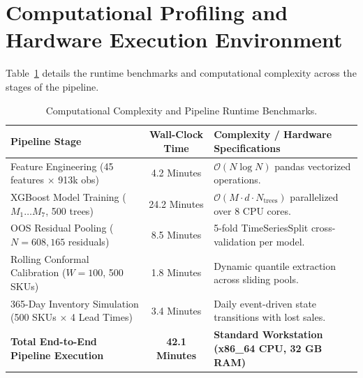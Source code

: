 \documentclass[11pt,a4paper]{article}
\begin{document}
\section{Computational Profiling and Hardware Execution Environment}
\label{app:computational_profiling}

Table~\ref{tab:app_computational} details the runtime benchmarks and computational complexity across the stages of the pipeline.

\begin{table}[htbp]
\centering
\small
\caption{Computational Complexity and Pipeline Runtime Benchmarks.}
\label{tab:app_computational}
\begin{tabular}{lcp{8.5cm}}
\toprule
\textbf{Pipeline Stage} & \textbf{Wall-Clock Time} & \textbf{Complexity / Hardware Specifications} \\
\midrule
Feature Engineering (45 features $\times$ 913k obs) & 4.2 Minutes & $\mathcal{O}(N \log N)$ pandas vectorized operations. \\
XGBoost Model Training ($M_1 \dots M_7$, 500 trees) & 24.2 Minutes & $\mathcal{O}(M \cdot d \cdot N_{\text{trees}})$ parallelized over 8 CPU cores. \\
OOS Residual Pooling ($N = 608,165$ residuals) & 8.5 Minutes & 5-fold TimeSeriesSplit cross-validation per model. \\
Rolling Conformal Calibration ($W=100$, 500 SKUs) & 1.8 Minutes & Dynamic quantile extraction across sliding pools. \\
365-Day Inventory Simulation (500 SKUs $\times$ 4 Lead Times) & 3.4 Minutes & Daily event-driven state transitions with lost sales. \\
\midrule
\textbf{Total End-to-End Pipeline Execution} & \textbf{42.1 Minutes} & \textbf{Standard Workstation (x86\_64 CPU, 32 GB RAM)} \\
\bottomrule
\end{tabular}
\end{table}
\end{document}
